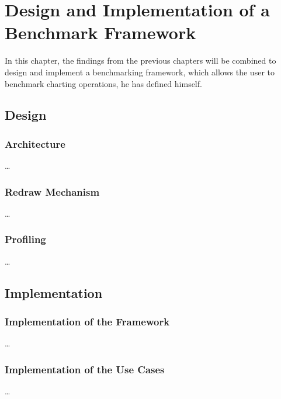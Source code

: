 

\chapter{Design and Implementation of a Benchmark Framework}
\label{ch:application}

In this chapter, the findings from the previous chapters will be combined
to design and implement a benchmarking framework, which allows the user to benchmark charting operations, he has defined himself. 



\section{Design}
\label{sec:application:design}

\subsection{Architecture}
\dots

\subsection{Redraw Mechanism}
\dots

\subsection{Profiling}
\dots



\section{Implementation}
\label{sec:application:implementation}

\subsection{Implementation of the Framework}
\dots

\subsection{Implementation of the Use Cases}
\dots

